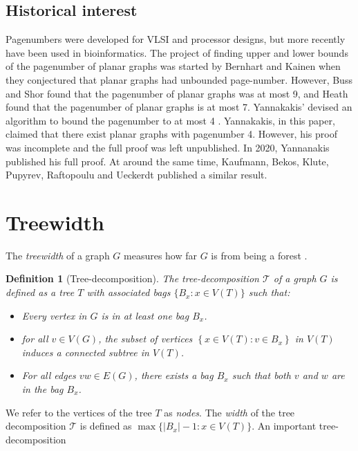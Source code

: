 \documentclass[]{report}
\newcommand{\tree}{\mathcal{T}}
\newtheorem{definition}[theorem]{Definition}
\theoremstyle{definition}
\numberwithin{theorem}{section}
\numberwithin{equation}{section}
\begin{document}
\subsection{Historical interest}\label{ssec:Pagenumber_History}
Pagenumbers were developed for VLSI and processor designs, but more recently have been used in bioinformatics.
The project of finding upper and lower bounds of the pagenumber of planar graphs was started by Bernhart and Kainen when they conjectured that planar graphs had unbounded page-number. However, Buss and Shor\cite{bussPagenumberPlanarGraphs1984} found that the pagenumber of planar graphs was at most 9, and Heath \cite{heathEmbeddingPlanarGraphs1984} found that the pagenumber of planar graphs is at most 7. Yannakakis' devised an algorithm to bound the pagenumber to at most 4 \cite{yannakakisEmbeddingPlanarGraphs1989}. Yannakakis, in this paper, claimed that there exist planar graphs with pagenumber 4. However, his proof was incomplete and the full proof was left unpublished. In 2020, Yannanakis published his full proof. \cite{yannakakisPlanarGraphsThat2020} At around the same time, Kaufmann, Bekos, Klute, Pupyrev, Raftopoulu and Ueckerdt published a similar result\cite{kaufmannFourPagesAre2020}. 

\section{Treewidth}\label{sec:treewidth}

The \textit{treewidth} of a graph $G$ measures how far $G$ is from being a forest \cite{diestelGraphMinors2017}. 

\begin{definition}[Tree-decomposition]\label{def:tree-decomposition}
	The tree-decomposition $\tree$ of a graph $G$ is defined as a tree $T$ with associated \textit{bags} $\lbrace B_x : x \in V(T) \rbrace$ such that:
	\begin{itemize}
		\item Every vertex in $G$ is in at least one bag $B_x$. 
		\item for all $v \in V(G)$, the subset of vertices $\left\lbrace x \in V(T): v \in B_x \right\rbrace$ in $V(T)$ induces a connected subtree in $V(T)$.
		\item For all edges $vw \in E(G)$, there exists a bag $B_x$ such that both $v$ and $w$ are in the bag $B_x$.
	\end{itemize}
\end{definition}
We refer to the vertices of the tree $T$ as \textit{nodes}. 
The \textit{width} of the tree decomposition $\tree$ is defined as $\max \lbrace |B_x| - 1 : x \in V(T) \rbrace$. An important tree-decomposition 
\end{document}
